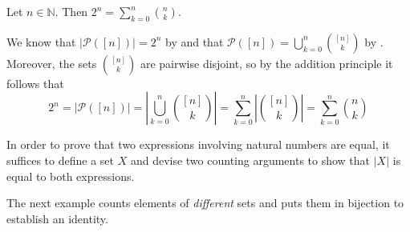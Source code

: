 \begin{proposition} \label{propSumOfBinomialsIsExp}
Let $n \in \mathbb{N}$. Then $2^n = \displaystyle\sum_{k=0}^n \binom{n}{k}$.
\end{proposition}
\begin{cproof}
We know that $|\mathcal{P}([n])| = 2^n$ by  and that $\mathcal{P}([n]) = \bigcup_{k=0}^n \binom{[n]}{k}$ by . Moreover, the sets $\binom{[n]}{k}$ are pairwise disjoint, so by the addition principle it follows that
\[ 2^n = |\mathcal{P}([n])| = \left|\bigcup_{k=0}^n \binom{[n]}{k}\right| = \sum_{k=0}^n \left| \binom{[n]}{k} \right| = \sum_{k=0}^n \binom{n}{k} \]
\end{cproof}

\begin{strategy}
In order to prove that two expressions involving natural numbers are equal, it suffices to define a set $X$ and devise two counting arguments to show that $|X|$ is equal to both expressions.
\end{strategy}

The next example counts elements of \textit{different} sets and puts them in bijection to establish an identity.

